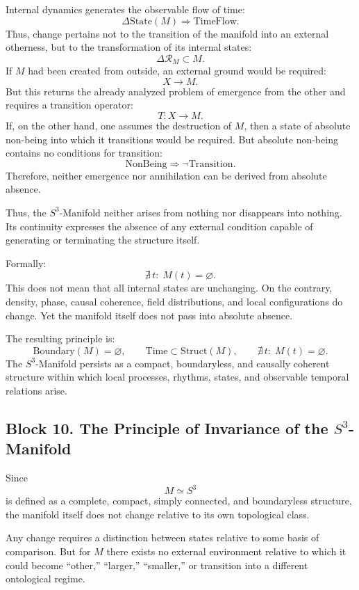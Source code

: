 \documentclass[12pt,a4paper]{article}
\theoremstyle{definition}
\begin{document}
Internal dynamics generates the observable flow of time:
\[
\Delta \mathrm{State}(M)\Rightarrow \mathrm{TimeFlow}.
\]
Thus, change pertains not to the transition of the manifold into an external otherness, but to the transformation of its internal states:
\[
\Delta\mathcal R_M\subset M.
\]
If \(M\) had been created from outside, an external ground would be required:
\[
X\to M.
\]
But this returns the already analyzed problem of emergence from the other and requires a transition operator:
\[
T:X\to M.
\]
If, on the other hand, one assumes the destruction of \(M\), then a state of absolute non-being into which it transitions would be required. But absolute non-being contains no conditions for transition:
\[
\mathrm{NonBeing}\Rightarrow \neg \mathrm{Transition}.
\]
Therefore, neither emergence nor annihilation can be derived from absolute absence.

Thus, the \(S^3\)-Manifold neither arises from nothing nor disappears into nothing. Its continuity expresses the absence of any external condition capable of generating or terminating the structure itself.

Formally:
\[
\nexists\, t :\; M(t)=\varnothing.
\]
This does not mean that all internal states are unchanging. On the contrary, density, phase, causal coherence, field distributions, and local configurations do change. Yet the manifold itself does not pass into absolute absence.

The resulting principle is:
\[
\mathrm{Boundary}(M)=\varnothing,
\qquad
\mathrm{Time}\subset \mathrm{Struct}(M),
\qquad
\nexists\, t :\; M(t)=\varnothing.
\]
The \(S^3\)-Manifold persists as a compact, boundaryless, and causally coherent structure within which local processes, rhythms, states, and observable temporal relations arise.







\subsection{Block 10. The Principle of Invariance of the \(S^3\)-Manifold}
Since
\[
M\simeq S^3
\]
is defined as a complete, compact, simply connected, and boundaryless structure, the manifold itself does not change relative to its own topological class.

Any change requires a distinction between states relative to some basis of comparison. But for \(M\) there exists no external environment relative to which it could become ``other,'' ``larger,'' ``smaller,'' or transition into a different ontological regime.
\end{document}
